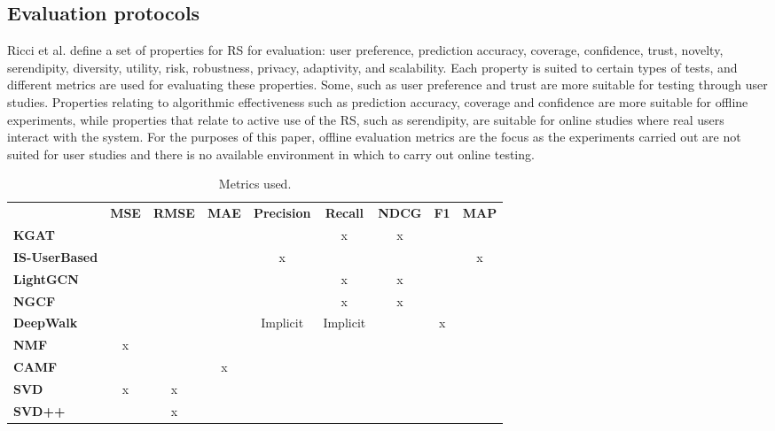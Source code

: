 \subsection{Evaluation protocols}\label{sec:evaluationmetrics}
Ricci et al.\cite{RecommenderHandbook2015} define a set of properties for RS for evaluation: user preference, prediction accuracy, coverage, confidence, trust, novelty, serendipity, diversity, utility, risk, robustness, privacy, adaptivity, and scalability.
Each property is suited to certain types of tests, and different metrics are used for evaluating these properties.
Some, such as user preference and trust are more suitable for testing through user studies.
Properties relating to algorithmic effectiveness such as prediction accuracy, coverage and confidence are more suitable for offline experiments, while properties that relate to active use of the RS, such as serendipity, are suitable for online studies where real users interact with the system.
For the purposes of this paper, offline evaluation metrics are the focus as the experiments carried out are not suited for user studies and there is no available environment in which to carry out online testing.
\begin{table*}[!htp]\centering
    \caption{Metrics used.}\label{tab:metricsused}
    \scriptsize
    \begin{tabular}{lcccccccc}\toprule
    &\textbf{MSE} &\textbf{RMSE} &\textbf{MAE} &\textbf{Precision} &\textbf{Recall} &\textbf{NDCG} &\textbf{F1} &\textbf{MAP} \\\cmidrule{2-9}
    \textbf{KGAT\cite{KGAT}} & & & & & x & x & & \\\cmidrule{1-9}
    \textbf{IS-UserBased\cite{GraphBasedCollaborativePaper}} & & & & x & & & & x \\\cmidrule{1-9}
    \textbf{LightGCN\cite{LightGCN}} & & & & & x & x & & \\\cmidrule{1-9}
    \textbf{NGCF\cite{NGCF} } & & & & & x & x & & \\\cmidrule{1-9}
    \textbf{DeepWalk\cite{DeepWalk}} & & & & Implicit & Implicit & & x & \\\cmidrule{1-9}
    \textbf{NMF\cite{NMF} } & x & & & & & & & \\\cmidrule{1-9}
    \textbf{CAMF\cite{baltrunasCAMF} } & & & x & & & & & \\\cmidrule{1-9}
    \textbf{SVD\cite{standardMF} } & x & x & & & & & & \\\cmidrule{1-9}
    \textbf{SVD++\cite{svd++} } & & x & & & & & & \\\cmidrule{1-9}
    \bottomrule

    \end{tabular}
\end{table*}
